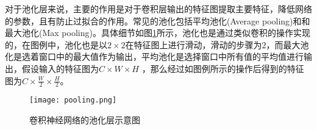 对于池化层来说，主要的作用是对于卷积层输出的特征图提取主要特征，降低网络的参数，且有防止过拟合的作用。常见的池化包括平均池化(Average pooling)和和最大池化(Max pooling)。具体细节如图\ref{fig:pooling-example}所示，池化也是通过类似卷积的操作实现的，在图例中，池化也是以$2 \times 2$在特征图上进行滑动，滑动的步骤为$2$，而最大池化是选着窗口中的最大值作为输出，平均池化是选择窗口中所有值的平均值进行输出，假设输入的特征图为$C \times W \times H$ ，那么经过如图例所示的操作后得到的特征图为$C \times \frac{W}{2} \times \frac{H}{2}$。
\begin{figure}[htpb]
	\centering
	\texttt{[image: pooling.png]}
    \caption{卷积神经网络的池化层示意图}
	\vspace*{-3.5mm}
	\label{fig:pooling-example}
\end{figure}

